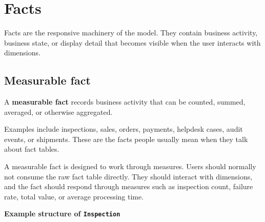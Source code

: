 \documentclass[10pt,openany,10pt]{book}
\begin{document}
\section{Facts}\label{facts}

Facts are the responsive machinery of the model. They contain business
activity, business state, or display detail that becomes visible when
the user interacts with dimensions.

\subsection{Measurable fact}\label{measurable-fact}

A \textbf{measurable fact} records business activity that can be
counted, summed, averaged, or otherwise aggregated.

Examples include inspections, sales, orders, payments, helpdesk cases,
audit events, or shipments. These are the facts people usually mean when
they talk about fact tables.

A measurable fact is designed to work through measures. Users should
normally not consume the raw fact table directly. They should interact
with dimensions, and the fact should respond through measures such as
inspection count, failure rate, total value, or average processing time.

\textbf{Example structure of
\texttt{\textquotesingle{}Inspection\textquotesingle{}}}
\end{document}
